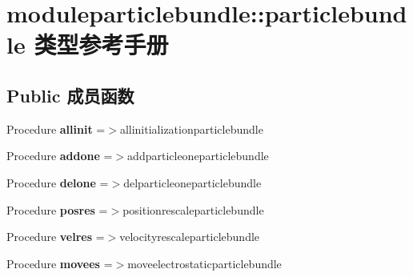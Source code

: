 \hypertarget{structmoduleparticlebundle_1_1particlebundle}{}\section{moduleparticlebundle\+::particlebundle 类型参考手册}
\label{structmoduleparticlebundle_1_1particlebundle}
\subsection*{Public 成员函数}
\begin{DoxyCompactItemize}
\item 
\mbox{\label{structmoduleparticlebundle_1_1particlebundle_a5769c7dcf06c9a096e910cc3ed0e9c50}} 
Procedure {\bfseries allinit} =$>$allinitializationparticlebundle
\item 
\mbox{\label{structmoduleparticlebundle_1_1particlebundle_a9af5c60afa052c4c448a48b6ee3efd3a}} 
Procedure {\bfseries addone} =$>$addparticleoneparticlebundle
\item 
\mbox{\label{structmoduleparticlebundle_1_1particlebundle_a0b4c765c6e4d3c54e557847af0674afa}} 
Procedure {\bfseries delone} =$>$delparticleoneparticlebundle
\item 
\mbox{\label{structmoduleparticlebundle_1_1particlebundle_a8bc1b759ad4ff0b2401426cbc280c56b}} 
Procedure {\bfseries posres} =$>$positionrescaleparticlebundle
\item 
\mbox{\label{structmoduleparticlebundle_1_1particlebundle_afb444944a1811228621fa82125ff9021}} 
Procedure {\bfseries velres} =$>$velocityrescaleparticlebundle
\item 
\mbox{\label{structmoduleparticlebundle_1_1particlebundle_aa37c879ba9b874ea923d8bdeeff3823b}} 
Procedure {\bfseries movees} =$>$moveelectrostaticparticlebundle
\item 
\mbox{\label{structmoduleparticlebundle_1_1particlebundle_a526931631002447982e0ac604bcabea0}} 

\end{DoxyCompactItemize}
